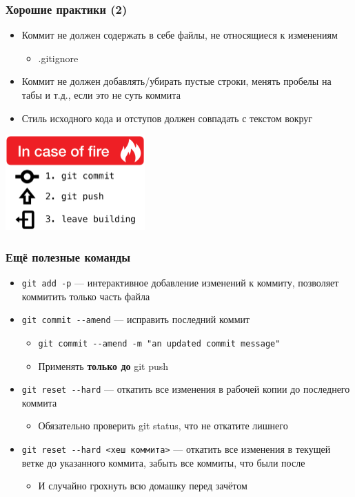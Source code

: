 \documentclass[xetex,mathserif,serif]{beamer}
\begin{document}
    \begin{frame}
        \frametitle{Хорошие практики (2)}
        \begin{itemize}
            \item Коммит не должен содержать в себе файлы, не относящиеся к изменениям
            \begin{itemize}
                \item .gitignore
            \end{itemize}
            \item Коммит не должен добавлять/убирать пустые строки, менять пробелы на табы и т.д., если это не суть коммита
            \item Стиль исходного кода и отступов должен совпадать с текстом вокруг
        \end{itemize}
        \begin{center}
            \includegraphics[width=0.4\textwidth]{inCaseOfFire.png}
        \end{center}
    \end{frame}

    \begin{frame}[fragile]
        \frametitle{Ещё полезные команды}
        \begin{itemize}
            \item \verb|git add -p| --- интерактивное добавление изменений к коммиту, позволяет коммитить только часть файла
            \item \verb|git commit --amend| --- исправить последний коммит
            \begin{itemize}
                \item \verb|git commit --amend -m "an updated commit message"|
                \item Применять \textbf{только до} git push
            \end{itemize}
            \item \verb|git reset --hard| --- откатить все изменения в рабочей копии до последнего коммита
            \begin{itemize}
                \item Обязательно проверить git status, что не откатите лишнего
            \end{itemize}
            \item \verb|git reset --hard <хеш коммита>| --- откатить все изменения в текущей ветке до указанного коммита, забыть все коммиты, что были после
            \begin{itemize}
                \item И случайно грохнуть всю домашку перед зачётом
            \end{itemize}
        \end{itemize}
    \end{frame}
    
\end{document}
